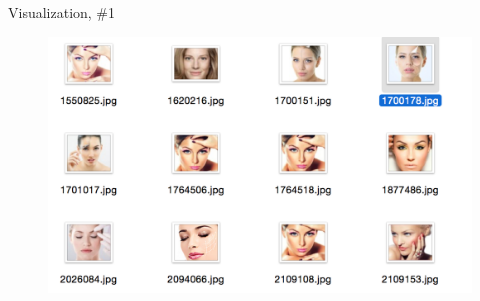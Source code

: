 \documentclass{beamer}
\begin{document}

\begin{frame}{Visualization, \#1}

\begin{figure}[h!]
  \centering
  \includegraphics[width=1\textwidth]{images/search1.png}
\end{figure}

\end{frame}
\end{document}
